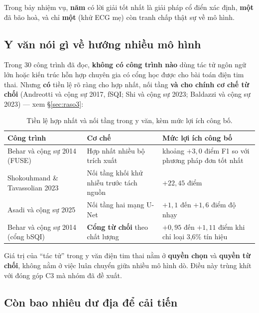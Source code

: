Trong bảy nhiệm vụ, \textbf{năm} có lời giải tốt nhất là giải pháp cổ điển xác định, \textbf{một} đã bão
hoà, và chỉ \textbf{một} (khử ECG mẹ) còn tranh chấp thật sự về mô hình.

\subsection{Y văn nói gì về hướng nhiều mô hình}

Trong 30 công trình đã đọc, \textbf{không có công trình nào} dùng tác tử ngôn ngữ lớn hoặc kiến trúc
hỗn hợp chuyên gia có cổng học được cho bài toán điện tim thai. Nhưng \textbf{có} tiền lệ rõ ràng cho
hợp nhất, nối tầng \textbf{và cho chính cơ chế từ chối} (Andreotti và cộng sự 2017, fSQI; Shi và cộng sự
2023; Baldazzi và cộng sự 2023) --- xem \S\ref{sec:raso3}:

\begin{table}[H]\centering\small
\caption{Tiền lệ hợp nhất và nối tầng trong y văn, kèm mức lợi ích công bố.}
\label{tab:ensemble}
\begin{tabular}{@{}L{5.4cm} L{4.4cm} L{4.6cm}@{}}
\toprule
\textbf{Công trình} & \textbf{Cơ chế} & \textbf{Mức lợi ích công bố} \\
\midrule
Behar và cộng sự 2014 (FUSE) & Hợp nhất nhiều bộ trích xuất & khoảng $+3{,}0$ điểm F1 so với phương
pháp đơn tốt nhất \\
Shokouhmand \& Tavassolian 2023 & Nối tầng khối khử nhiễu trước tách nguồn & $+22{,}45$ điểm \\
Asadi và cộng sự 2025 & Nối tầng hai mạng U-Net & $+1{,}1$ đến $+1{,}6$ điểm độ nhạy \\
Behar và cộng sự 2014 (cổng bSQI) & \textbf{Cổng từ chối} theo chất lượng & $+0{,}95$ đến $+1{,}11$ điểm
khi chỉ loại 3,6\% tín hiệu \\
\bottomrule
\end{tabular}
\end{table}

\begin{ghichu}[title={Kết luận quan trọng nhất của mục này}]
Giá trị của ``tác tử'' trong y văn điện tim thai nằm ở \textbf{quyền chọn} và \textbf{quyền từ chối},
không nằm ở việc luân chuyển giữa nhiều mô hình dò. Điều này trùng khít với đóng góp C3 mà nhóm đã đề xuất.
\end{ghichu}

\subsection{Còn bao nhiêu dư địa để cải tiến}

